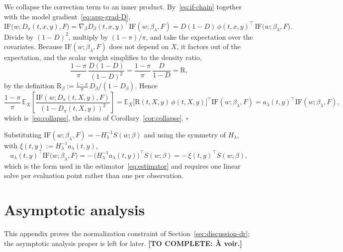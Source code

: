 \documentclass[11pt]{article}
\newcommand{\TODO}[1]{\textbf{[TO COMPLETE: #1]}}
\theoremstyle{plain}
\theoremstyle{definition}
\theoremstyle{remark}
\newcommand{\pE}{\ensuremath{\mathbb{E}}}
\newcommand{\ratio}{\ensuremath{\pi}}
\newcommand{\contrast}{D_{\ratio}}
\newcommand{\DensityRatio}{\text{R}}
\newcommand{\IF}{\mathrm{IF}}
\newcommand{\score}{S}
\begin{document}
We collapse the correction term to an inner product. By~\eqref{eq:if-chain} together with the
model gradient~\eqref{eq:app-grad-D},
\[
\IF\big(w;\contrast(t,x,y),F\big)
= \nabla_\beta D_\beta(t,x,y)^\top \IF(w;\beta_\lambda,F)
= D(1-D)\,\phi(t,x,y)^\top\,\IF\big(w;\beta_\lambda,F\big).
\]
Divide by $(1-D)^2$, multiply by $(1-\ratio)/\ratio$, and take the expectation over the
covariates. Because $\IF(w;\beta_\lambda,F)$ does not depend on $X$, it factors out of the
expectation, and the scalar weight simplifies to the density ratio,
\[
\frac{1-\ratio}{\ratio}\,\frac{D(1-D)}{(1-D)^2}
= \frac{1-\ratio}{\ratio}\,\frac{D}{1-D}
= \DensityRatio ,
\]
by the definition
$\DensityRatio_\beta := \tfrac{1-\ratio}{\ratio}\,D_\beta/(1-D_\beta)$. Hence
\[
\frac{1-\ratio}{\ratio}\,
\pE_X\!\left[ \frac{\IF(w;\contrast(t,X,y),F)}{(1-\contrast(t,X,y))^2} \right]
= \pE_X\big[ \DensityRatio(t,X,y)\,\phi(t,X,y) \big]^\top \IF(w;\beta_\lambda,F)
= a_\lambda(t,y)^\top \IF(w;\beta_\lambda,F),
\]
which is~\eqref{eq:collapse}, the claim of Corollary~\ref{cor:collapse}. \hfill$\square$

Substituting $\IF(w;\beta_\lambda,F) = -H_\lambda^{-1}\score(w;\beta)$ and using the symmetry of
$H_\lambda$, with $\xi(t,y) := H_\lambda^{-1}a_\lambda(t,y)$,
\[
a_\lambda(t,y)^\top \IF\big(w;\beta_\lambda,F\big)
= -\,\big( H_\lambda^{-1}a_\lambda(t,y) \big)^\top \score(w;\beta)
= -\,\xi(t,y)^\top \score(w;\beta),
\]
which is the form used in the estimator~\eqref{eq:estimator} and requires one linear solve per
evaluation point rather than one per observation.

\section{Asymptotic analysis}
\label{app:asymptotics}

This appendix proves the normalization constraint of Section~\ref{sec:discussion-dr}; the
asymptotic analysis proper is left for later. \TODO{À voir.}
%
%
\end{document}
